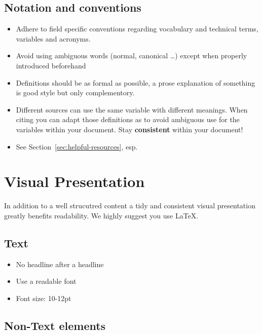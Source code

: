 \documentclass[nodate]{proc}
\begin{document}
\subsection{Notation and conventions}

\begin{itemize}
	\item Adhere to field specific conventions regarding vocabulary and technical terms, variables and acronyms.
	\item Avoid using ambiguous words (normal, canonical \dots) except when properly introduced beforehand
	\item Definitions should be as formal as possible, a prose explanation of something is good style but only complementory.
	\item Different sources can use the same variable with different meanings. When citing you can adapt those definitions as to avoid ambiguous use for the variables within your document. Stay \textbf{consistent} within your document!
	\item See Section~\ref{sec:helpful-resources}, esp. \cite[pp. 1-8]{knuth_mathematical_writing}
\end{itemize}

\section{Visual Presentation}

In addition to a well strucutred content a tidy and consistent visual presentation greatly benefits readability. We highly suggest you use \LaTeX.

\subsection{Text}
\begin{itemize}
	\item No headline after a headline
	\item Use a readable font
	\item Font size: 10-12pt
\end{itemize}

\subsection{Non-Text elements}
\end{document}

